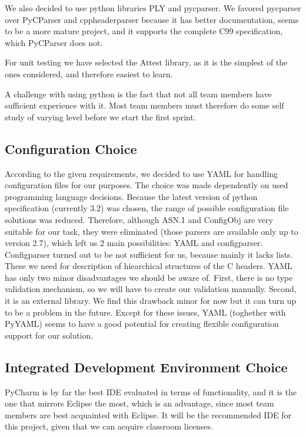 We also decided to use python libraries PLY and pycparser. We favored pycparser
over PyCParser and cppheaderparser because it has better documentation, seems
to be a more mature project, and it supports the complete C99 specification,
which PyCParser does not.

For unit testing we have selected the Attest library, as it is the simplest of
the ones considered, and therefore easiest to learn.

A challenge with using python is the fact that not all team members have
sufficient experience with it. Most team members must therefore do some self
study of varying level before we start the first sprint.

\subsection{Configuration Choice}
According to the given requirements, we decided to use YAML for handling
configuration files for our purposes. The choice was made dependently on used
programming language decisions. Because the latest version of python
specification (currently 3.2) was chosen, the range of possible configuration
file solutions was reduced. Therefore, although ASN.1 and ConfigObj are very
suitable for our task, they were eliminated (those parsers are available only
up to version 2.7), which left us 2 main possibilities: YAML and configparser.
Configparser turned out to be not sufficient for us, because mainly it lacks
lists. These we need for description of hiearchical structures of the C
headers. YAML has only two minor disadvantages we should be aware of. First,
there is no type validation mechanism, so we will have to create our validation
manually. Second, it is an external library. We find this drawback minor for
now but it can turn up to be a problem in the future. Except for these issues,
YAML (toghether with PyYAML) seems to have a good potential for creating
flexible configuration support for our solution.

\subsection{Integrated Development Environment Choice}
PyCharm is by far the best IDE evaluated in terms of functionality, and it is
the one that mirrors Eclipse the most, which is an advantage, since most team
members are best acquainted with Eclipse. It will be the recommended IDE for
this project, given that we can acquire classroom licenses.

